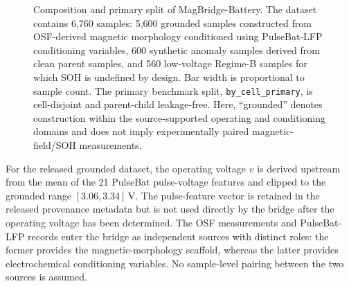 \documentclass[11pt]{article}
\begin{document}
\begin{figure}[!htbp]
\caption{Composition and primary split of MagBridge-Battery.
The dataset contains 6{,}760 samples: 5{,}600 grounded samples constructed
from OSF-derived magnetic morphology conditioned using PulseBat-LFP conditioning variables, 600 synthetic anomaly samples derived from clean
parent samples, and 560 low-voltage Regime-B samples for which SOH is
undefined by design. Bar width is proportional to sample count.
The primary benchmark split, \texttt{by\_cell\_primary}, is cell-disjoint
and parent-child leakage-free. Here, ``grounded'' denotes construction
within the source-supported operating and conditioning domains and does
not imply experimentally paired magnetic-field/SOH measurements.}
\label{fig:composition}
\end{figure}

For the released grounded dataset, the operating voltage $v$ is derived upstream from the mean of the 21 PulseBat pulse-voltage features and clipped to the grounded range $[3.06,3.34]$\,V. The pulse-feature vector is retained in the released provenance metadata but is not used directly by the bridge after the operating voltage has been determined. The OSF measurements and PulseBat-LFP records enter the bridge as independent sources with distinct roles: the former provides the magnetic-morphology scaffold, whereas the latter provides electrochemical conditioning variables. No sample-level pairing between the two sources is assumed.
\end{document}
